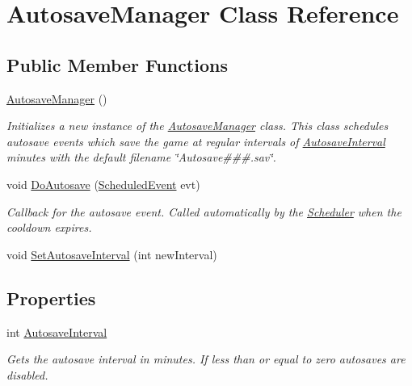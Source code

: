 \hypertarget{class_autosave_manager}{}\section{Autosave\+Manager Class Reference}
\label{class_autosave_manager}
\subsection*{Public Member Functions}
\begin{DoxyCompactItemize}
\item 
\hyperlink{class_autosave_manager_a9856885198573cc21eec3034d77bc50e}{Autosave\+Manager} ()
\begin{DoxyCompactList}\small\item\em Initializes a new instance of the \hyperlink{class_autosave_manager}{Autosave\+Manager} class. This class schedules autosave events which save the game at regular intervals of \hyperlink{class_autosave_manager_aa499ab2fe041ef5134db38b40404329f}{Autosave\+Interval} minutes with the default filename \char`\"{}\+Autosave\#\#\#.\+sav\char`\"{}. \end{DoxyCompactList}\item 
void \hyperlink{class_autosave_manager_a1380021fcada31aa86065ff956d113ae}{Do\+Autosave} (\hyperlink{class_scheduler_1_1_scheduled_event}{Scheduled\+Event} evt)
\begin{DoxyCompactList}\small\item\em Callback for the autosave event. Called automatically by the \hyperlink{namespace_scheduler}{Scheduler} when the cooldown expires. \end{DoxyCompactList}\item 
void \hyperlink{class_autosave_manager_a66567b6e5e1ec3a234656bb24b82dcca}{Set\+Autosave\+Interval} (int new\+Interval)
\end{DoxyCompactItemize}
\subsection*{Properties}
\begin{DoxyCompactItemize}
\item 
int \hyperlink{class_autosave_manager_aa499ab2fe041ef5134db38b40404329f}{Autosave\+Interval}
\begin{DoxyCompactList}\small\item\em Gets the autosave interval in minutes. If less than or equal to zero autosaves are disabled. \end{DoxyCompactList}\end{DoxyCompactItemize}



